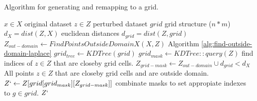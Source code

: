 \begin{algorithm}[H]
  \caption{Algorithm for generating and remapping to a grid.}
  \begin{algorithmic}
    \Require $x \in X$  \Comment original dataset
    \Require $z \in Z$ \Comment perturbed dataset
    \Require $grid$ \Comment grid structure ($n * m$)
    \State $d_{X} = dist(Z, X)$ \Comment euclidean distances
    \State $d_{grid} = dist(Z, grid)$ 
    \State $Z_{out-domain} \gets FindPointsOutsideDomainX(X, Z)$ \Comment Algorithm \ref{alg:find-outside-domain-laplace}
    \State $grid_{tree} \gets KDTree(grid)$ 
    \State $grid_{mask} \gets KDTree::query(Z)$ \Comment find indices of $z \in Z$ that are closeby grid cells.
    \State $Z_{grid-mask} \gets Z_{out-domain} \cup d_{grid} < d_{X}$ \Comment All points $z \in Z$ that are closeby grid cells and are outside domain.
    \State $Z` \gets Z[grid[grid_{mask}][Z_{grid-mask}]]$ \Comment combinate masks to set appropiate indexes to $g \in grid$.
    \State \Return $Z`$
  \end{algorithmic}
  \label{alg:grid-remapping-laplace}
\end{algorithm}